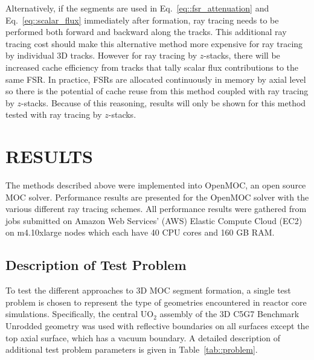 Alternatively, if the segments are used in Eq.~\ref{eq::fsr_attenuation} and Eq.~\ref{eq::scalar_flux} immediately after formation, ray tracing needs to be performed both forward and backward along the tracks. This additional ray tracing cost should make this alternative method more expensive for ray tracing by individual 3D tracks. However for ray tracing by $z$-stacks, there will be increased cache efficiency from tracks that tally scalar flux contributions to the same FSR. In practice, FSRs are allocated continuously in memory by axial level so there is the potential of cache reuse from this method coupled with ray tracing by $z$-stacks. Because of this reasoning, results will only be shown for this method tested with ray tracing by $z$-stacks.

\section{RESULTS}

The methods described above were implemented into OpenMOC\cite{openmoc}, an open source MOC solver. Performance results are presented for the OpenMOC solver with the various different ray tracing schemes. All performance results were gathered from jobs submitted on Amazon Web Services' (AWS) Elastic Compute Cloud (EC2) on m4.10xlarge nodes which each have 40 CPU cores and 160 GB RAM.

\subsection{Description of Test Problem}
To test the different approaches to 3D MOC segment formation, a single test problem is chosen to represent the type of geometries encountered in reactor core simulations. Specifically, the central UO$_{\text{2}}$ assembly of the 3D C5G7 Benchmark Unrodded geometry was used with reflective boundaries on all surfaces except the top axial surface, which has a vacuum boundary. A detailed description of additional test problem parameters is given in Table~\ref{tab::problem}.

